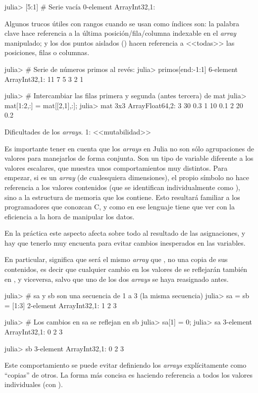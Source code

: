 ﻿\documentclass[spanish]{article}
\begin{document}
julia> [5:1] # Serie vacía
0-element Array{Int32,1}:

Algunos trucos útiles con rangos cuando se usan como índices son:
la palabra clave  hace referencia a la última posición/fila/columna
indexable en el \emph{array} manipulado; y los dos puntos aislados
(\code{:}) hacen referencia a <<todas>> las posiciones, filas
o columnas.

julia> # Serie de números primos al revés:
julia> primos[end:-1:1]
6-element Array{Int32,1}:
 11
 7
 5
 3
 2
 1

julia> # Intercambiar las filas primera y segunda (antes tercera) de mat
julia> mat[1:2,:] = mat[[2,1],:];
julia> mat
3x3 Array{Float64,2}:
 3 30 0.3
 1 10 0.1
 2 20 0.2

Dificultades de los \emph{arrays}. 1: <<mutabilidad>>

Es importante tener en cuenta que los \emph{arrays} en Julia no son
sólo agrupaciones de valores para manejarlos de forma conjunta. Son
un tipo de variable diferente a los valores escalares, que muestra
unos comportamientos muy distintos. Para empezar, si  es
un \emph{array} (de cualesquiera dimensiones), el propio símbolo 
no hace referencia a los valores contenidos (que se identifican individualmente
como ), sino a la estructura de memoria que los contiene.
Esto resultará familiar a los programadores que conozcan C, y como
en ese lenguaje tiene que ver con la eficiencia a la hora de manipular
los datos.

En la práctica este aspecto afecta sobre todo al resultado de las
asignaciones, y hay que tenerlo muy encuenta para evitar cambios inesperados
en las variables.

En particular,  significa que  será el mismo
\emph{array} que , no una copia de sus contenidos, es decir
que cualquier cambio en los valores de  se reflejarán también
en , y viceversa, salvo que uno de los dos \emph{arrays}
se haya reasignado antes.

julia> # sa y sb son una secuencia de 1 a 3 (la misma secuencia)
julia> sa = sb = [1:3]
2-element Array{Int32,1}:
 1 2 3

julia> # Los cambios en sa se reflejan en sb
julia> sa[1] = 0;
julia> sa
3-element Array{Int32,1}:
 0 2 3

julia> sb 3-element
Array{Int32,1}:
 0 2 3

Este comportamiento se puede evitar definiendo los \emph{arrays} explícitamente
como ``copias'' de otros. La forma más concisa es haciendo referencia
a todos los valores individuales (con \code{[:]}).
\end{document}
